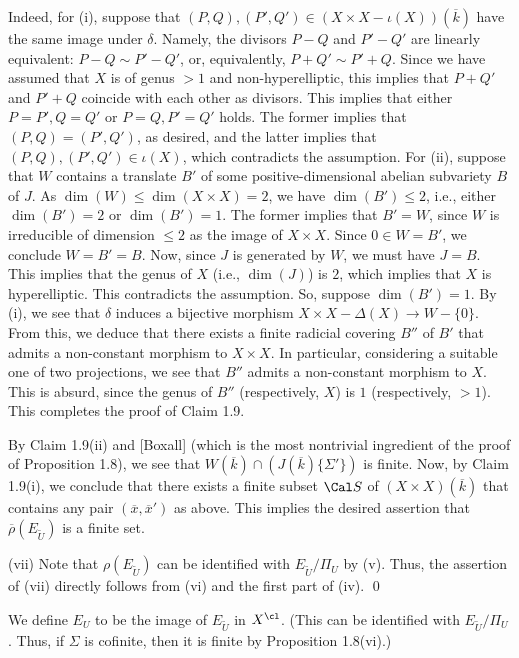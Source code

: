 Indeed, for (i), suppose that $(P,Q),(P',Q')\in 
(X\times X-\iota(X))(\overline{k})$ have the same image 
under $\delta$. Namely, the divisors $P-Q$ and $P'-Q'$ 
are linearly equivalent: $P-Q\sim P'-Q'$, or, equivalently, 
$P+Q'\sim P'+Q$. Since we have assumed that $X$ is of genus 
$>1$ and non-hyperelliptic, this implies that 
$P+Q'$ and $P'+Q$ coincide with each other as divisors. 
This implies that either $P=P',Q=Q'$ or $P=Q,P'=Q'$ holds. 
The former implies that $(P,Q)=(P',Q')$, as desired, and 
the latter implies that $(P,Q),(P',Q')\in\iota(X)$, which 
contradicts the assumption. For (ii), suppose that 
$W$ contains a translate $B'$ of some positive-dimensional 
abelian subvariety $B$ of $J$. As $\dim(W)\leq\dim(X\times X)=2$, 
we have $\dim(B')\leq 2$, i.e., either $\dim(B')=2$ or 
$\dim(B')=1$. The former implies that $B'=W$, since $W$ is 
irreducible of dimension $\leq 2$ as the image of $X\times X$. 
Since $0\in W=B'$, we conclude $W=B'=B$. Now, since $J$ is generated 
by $W$, we must have $J=B$. This implies that the genus of $X$ 
(i.e., $\dim(J)$) is $2$, which implies that $X$ is hyperelliptic. 
This contradicts the assumption. So, suppose $\dim(B')=1$. 
By (i), we see that $\delta$ induces a bijective morphism 
$X\times X-\Delta(X)\to W-\{0\}$. From this, we deduce that 
there exists a finite radicial covering $B''$ of $B'$ that 
admits a non-constant morphism to $X\times X$. 
In particular, considering a suitable one of two projections, 
we see that $B''$ admits a non-constant morphism to $X$. 
This is absurd, since the genus of $B''$ (respectively, $X$) is 
$1$ (respectively, $>1$). This completes the proof of Claim 1.9. 

By Claim 1.9(ii) and [Boxall] (which is the most nontrivial 
ingredient of the proof of Proposition 1.8), we see that 
$W(\overline{k})\cap (J(\overline{k})\{\Sigma'\})$ is finite. 
Now, by Claim 1.9(i), we conclude that there exists a finite 
subset $\Cal S$ of $(X\times X)(\overline{k})$ that contains 
any pair $({\overline x},{\overline x}')$ as above. This implies the 
desired assertion that 
${\overline \rho}(E_{\tilde U})$ is a finite set. 

\noindent
(vii) Note that $\rho(E_{\tilde U})$ 
can be identified with $E_{\tilde U}/\Pi_U$ by 
(v). Thus, the assertion of (vii) directly follows from 
(vi) and the first part of (iv). 
\qed
\enddemo

We define $E_U$ to be the image of $E_{\tilde U}$ in $X^{\cl}$. 
(This can be identified with 
$E_{\tilde U}/\Pi_U$. Thus, if $\Sigma$ is cofinite, then it 
is finite by Proposition 1.8(vi).) 
\enddefinition


